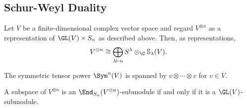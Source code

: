 \documentclass[../main.tex]{subfiles}
\begin{document}
\subsection{Schur-Weyl Duality}

\begin{theorem}
    Let $ V $ be a finite-dimensional complex vector space and regard $ V^{\otimes n} $ as a representation of $ \GL(V)\times S_{n} $ as described above. Then, as representations,
    \[
        V^{\otimes n} \cong \bigoplus_{\lambda\vdash n}S^{\lambda} \otimes_{\C} \mathbb{S}_{\lambda}(V).
    \]
\end{theorem}


\begin{lemma}\label{lem:symspan}
    The symmetric tensor power $ \Sym^{n}(V) $ is spanned by $ v \otimes \cdots \otimes v $ for $ v\in V $.
\end{lemma}



\begin{lemma}
    A subspace of $ V^{\otimes n} $ is an $ \End_{S_{n}}(V^{\otimes n}) $-submodule if and only if it is a $ \GL(V) $-submodule.
\end{lemma}
\end{document}
